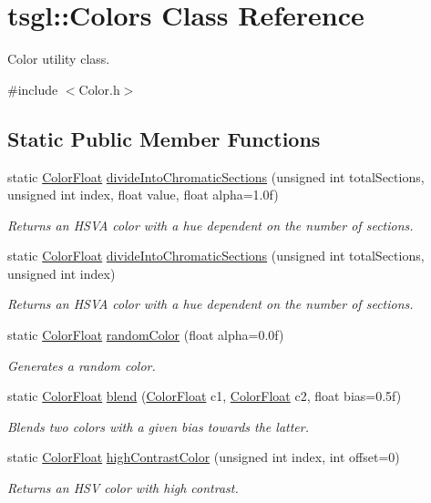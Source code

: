 \hypertarget{classtsgl_1_1_colors}{}\section{tsgl\+:\+:Colors Class Reference}
\label{classtsgl_1_1_colors}


Color utility class.  




{\ttfamily \#include $<$Color.\+h$>$}

\subsection*{Static Public Member Functions}
\begin{DoxyCompactItemize}
\item 
static \hyperlink{structtsgl_1_1_color_float}{Color\+Float} \hyperlink{classtsgl_1_1_colors_af610e20b5176294e24fdae4af4f5d6dc}{divide\+Into\+Chromatic\+Sections} (unsigned int total\+Sections, unsigned int index, float value, float alpha=1.\+0f)
\begin{DoxyCompactList}\small\item\em Returns an H\+S\+VA color with a hue dependent on the number of sections. \end{DoxyCompactList}\item 
static \hyperlink{structtsgl_1_1_color_float}{Color\+Float} \hyperlink{classtsgl_1_1_colors_ab9c66054f181ca5db5839ede985fb112}{divide\+Into\+Chromatic\+Sections} (unsigned int total\+Sections, unsigned int index)
\begin{DoxyCompactList}\small\item\em Returns an H\+S\+VA color with a hue dependent on the number of sections. \end{DoxyCompactList}\item 
static \hyperlink{structtsgl_1_1_color_float}{Color\+Float} \hyperlink{classtsgl_1_1_colors_a0f28a13af4a0fc352a250c23ecc97e4f}{random\+Color} (float alpha=0.\+0f)
\begin{DoxyCompactList}\small\item\em Generates a random color. \end{DoxyCompactList}\item 
static \hyperlink{structtsgl_1_1_color_float}{Color\+Float} \hyperlink{classtsgl_1_1_colors_a26a34b86c0b70fe4984a91a24a0f263f}{blend} (\hyperlink{structtsgl_1_1_color_float}{Color\+Float} c1, \hyperlink{structtsgl_1_1_color_float}{Color\+Float} c2, float bias=0.\+5f)
\begin{DoxyCompactList}\small\item\em Blends two colors with a given bias towards the latter. \end{DoxyCompactList}\item 
static \hyperlink{structtsgl_1_1_color_float}{Color\+Float} \hyperlink{classtsgl_1_1_colors_a93d3fc815542e586dbc1ecf3e984e0b6}{high\+Contrast\+Color} (unsigned int index, int offset=0)
\begin{DoxyCompactList}\small\item\em Returns an H\+SV color with high contrast. \end{DoxyCompactList}\end{DoxyCompactItemize}


